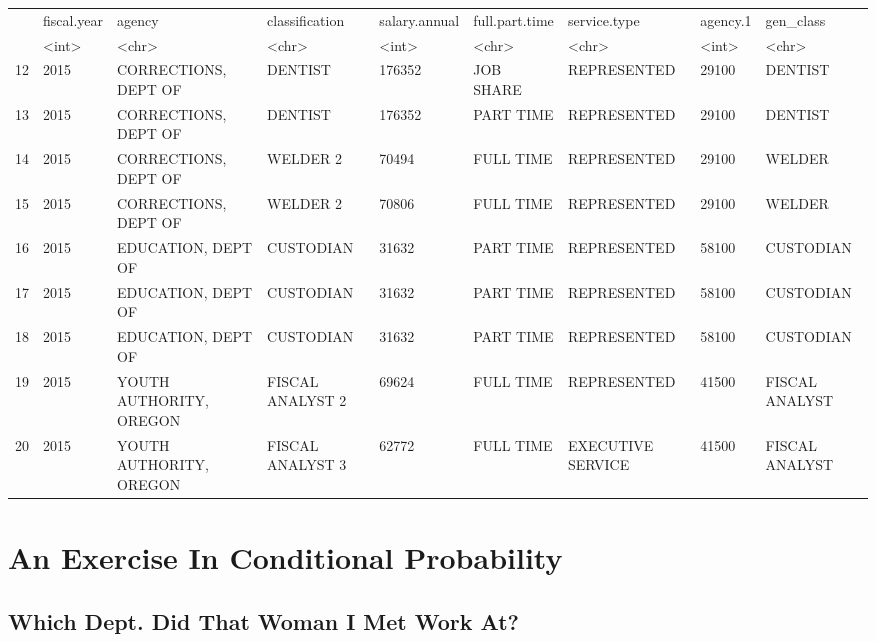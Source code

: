 \documentclass[letterpaper]{article}
\theoremstyle{definition}
\begin{document}
    

\begin{tabular}{r|llllllll}
  & fiscal.year & agency & classification & salary.annual & full.part.time & service.type & agency.1 & gen\_class\\
  & <int> & <chr> & <chr> & <int> & <chr> & <chr> & <int> & <chr>\\
\hline
	12 & 2015 & CORRECTIONS, DEPT OF    & DENTIST          & 176352 & JOB SHARE & REPRESENTED       & 29100 & DENTIST       \\
	13 & 2015 & CORRECTIONS, DEPT OF    & DENTIST          & 176352 & PART TIME & REPRESENTED       & 29100 & DENTIST       \\
	14 & 2015 & CORRECTIONS, DEPT OF    & WELDER 2         &  70494 & FULL TIME & REPRESENTED       & 29100 & WELDER        \\
	15 & 2015 & CORRECTIONS, DEPT OF    & WELDER 2         &  70806 & FULL TIME & REPRESENTED       & 29100 & WELDER        \\
	16 & 2015 & EDUCATION, DEPT OF      & CUSTODIAN        &  31632 & PART TIME & REPRESENTED       & 58100 & CUSTODIAN     \\
	17 & 2015 & EDUCATION, DEPT OF      & CUSTODIAN        &  31632 & PART TIME & REPRESENTED       & 58100 & CUSTODIAN     \\
	18 & 2015 & EDUCATION, DEPT OF      & CUSTODIAN        &  31632 & PART TIME & REPRESENTED       & 58100 & CUSTODIAN     \\
	19 & 2015 & YOUTH AUTHORITY, OREGON & FISCAL ANALYST 2 &  69624 & FULL TIME & REPRESENTED       & 41500 & FISCAL ANALYST\\
	20 & 2015 & YOUTH AUTHORITY, OREGON & FISCAL ANALYST 3 &  62772 & FULL TIME & EXECUTIVE SERVICE & 41500 & FISCAL ANALYST\\
\end{tabular}

	\hypertarget{getting-my-feet-wet-creeping-on-people-i-met-once}{ 
		\section{An Exercise In Conditional Probability}
		\label{getting-my-feet-wet-creeping-on-people-i-met-once}}

\hypertarget{which-dept.-did-that-woman-i-met-work-at}{%
\subsection{Which Dept. Did That Woman I Met Work
At?}\label{which-dept.-did-that-woman-i-met-work-at}}
\end{document}
